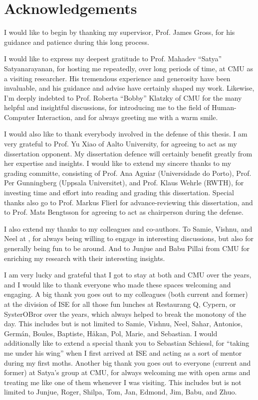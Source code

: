 \chapter{Acknowledgements}
\glsresetall%

I would like to begin by thanking my supervisor, Prof. James Gross, for his guidance and patience during this long process.

I would like to express my deepest gratitude to Prof. Mahadev ``Satya'' Satyanarayanan, for hosting me repeatedly, over long periods of time, at \gls{CMU} as a visiting researcher.
His tremendous experience and generosity have been invaluable, and his guidance and advise have certainly shaped my work.
Likewise, I'm deeply indebted to Prof. Roberta ``Bobby'' Klatzky of \gls{CMU} for the many helpful and insightful discussions, for introducing me to the field of Human-Computer Interaction, and for always greeting me with a warm smile.

I would also like to thank everybody involved in the defense of this thesis.
I am very grateful to Prof. Yu Xiao of Aalto University, for agreeing to act as my dissertation opponent.
My dissertation defence will certainly benefit greatly from her expertise and insights.
I would like to extend my sincere thanks to my grading committe, consisting of Prof. Ana Aguiar (Universidade do Porto), Prof. Per Gunningberg (Uppsala Universitet), and Prof. Klaus Wehrle (\gls{RWTH}), for investing time and effort into reading and grading this dissertation.
Special thanks also go to Prof. Markus Flierl for advance-reviewing this dissertation, and to Prof. Mats Bengtsson for agreeing to act as chairperson during the defense.

I also extend my thanks to my colleagues and co-authors.
To Samie, Vishnu, and Neel at , for always being willing to engage in interesting discussions, but also for generally being fun to be around.
And to Junjue and Babu Pillai from \gls{CMU} for enriching my research with their interesting insights.

I am very lucky and grateful that I got to stay at both  and \gls{CMU} over the years, and I would like to thank everyone who made these spaces welcoming and engaging.
A big thank you goes out to my colleagues (both current and former) at the division of \gls{ISE} for all those fun lunches at Restaurang Q, Cypern, or SysterOBror over the years, which always helped to break the monotony of the day.
This includes but is not limited to Samie, Vishnu, Neel, Sahar, Antonios, Germán, Boules, Baptiste, Håkan, Pol, Marie, and Sebastian.
I would additionally like to extend a special thank you to Sebastian Schiessl, for ``taking me under his wing'' when I first arrived at \gls{ISE} and acting as a sort of mentor during my first moths.
Another big thank you goes out to everyone (current and former) at Satya's group at \gls{CMU}, for always welcoming me with open arms and treating me like one of them whenever I was visiting.
This includes but is not limited to Junjue, Roger, Shilpa, Tom, Jan, Edmond, Jim, Babu, and Zhuo.

